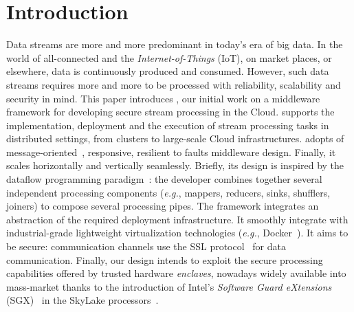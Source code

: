 \section{Introduction}
\label{sec:introduction}

Data streams are more and more predominant in today's era of big data.
In the world of all-connected and the \emph{Internet-of-Things} (IoT), on market places, or elsewhere, data is continuously produced and consumed.
However, such data streams requires more and more to be processed with reliability, scalability and security in mind.
This paper introduces \SYS{}, our initial work on a middleware framework for developing secure stream processing in the Cloud.
\SYS{} supports the implementation, deployment and the execution of stream processing tasks in distributed settings, from clusters to large-scale Cloud infrastructures.
\SYS{} adopts of message-oriented~\cite{mom}, responsive, resilient to faults middleware design.
Finally, it scales horizontally and vertically seamlessly.
Briefly, its design is inspired by the dataflow programming paradigm~\cite{uustalu_essence_2005}: the developer combines together several independent processing components (\emph{e.g.}, mappers, reducers, sinks, shufflers, joiners) to compose several processing pipes.%
The framework integrates an abstraction of the required deployment infrastructure.
It smoothly integrate with industrial-grade lightweight virtualization technologies (\emph{e.g.}, Docker~\cite{docker}).
It aims to be secure: communication channels use the SSL protocol~\cite{freier2011secure} for data communication.
Finally, our design intends to exploit the secure processing capabilities offered by trusted hardware \emph{enclaves}, nowadays widely available into mass-market thanks to the introduction of Intel's \emph{Software Guard eXtensions} (SGX)~\cite{costan_intel} in the SkyLake processors~\cite{skylake}.

